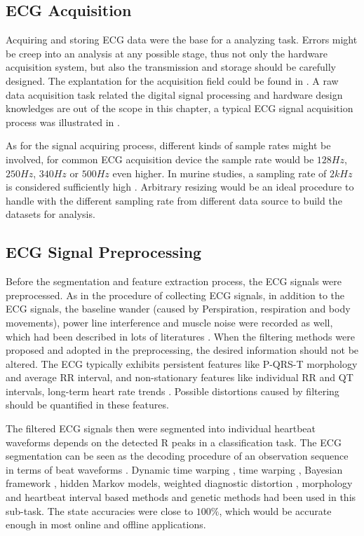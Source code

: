 \documentclass[graybox]{svmult}
\begin{document}
\subsection{ECG Acquisition}
Acquiring and storing ECG data were the base for a analyzing task. Errors might be creep into an analysis at any possible stage, thus not only the hardware acquisition system, but also the transmission and storage should be carefully designed. The explantation for the acquisition field could be found in \citep{clifford2006web}. A raw data acquisition task related the digital signal processing and hardware design knowledges are out of the scope in this chapter, a typical ECG signal acquisition process was illustrated in \citep{silva2011dsp}. 

As for the signal acquiring process, different kinds of sample rates might be involved, for common ECG acquisition device the sample rate would be $128Hz$, $250Hz$, $340Hz$ or $500Hz$ even higher. In murine studies, a sampling rate of $2kHz$ is considered sufficiently high \citep{ai1996studies}. Arbitrary resizing would be an ideal procedure to handle with the different sampling rate from different data source to build the datasets for analysis.

\subsection{ECG Signal Preprocessing}
Before the segmentation and feature extraction process, the ECG signals were preprocessed. As in the procedure of collecting ECG signals,  in addition to the ECG signals, the baseline wander (caused by Perspiration, respiration and body movements), power line interference and muscle noise were recorded as well, which had been described in lots of literatures \citep{blanco2008ecg}.
When the filtering methods were proposed and adopted in the preprocessing, the desired information should not be altered. The ECG typically exhibits persistent features like P-QRS-T morphology and average RR interval,  and non-stationary features like individual RR and QT intervals, long-term heart rate trends \citep{clifford2006advanced}. Possible distortions caused by filtering should be quantified in these features.

The filtered ECG signals then were segmented into individual heartbeat waveforms depends on the detected R peaks in a classification task.  The ECG segmentation can be seen as the decoding procedure of an observation sequence in terms of beat waveforms \citep{andreao2006ecg}. Dynamic time warping \citep{vullings1998automated}, time warping \citep{vullings1997ecg}, Bayesian framework \citep{sayadi2009model}, hidden Markov models\citep{andreao2006ecg}, weighted diagnostic distortion \citep{zigel2000weighted}, morphology and heartbeat interval based methods \citep{de2004automatic} and genetic methods \citep{gacek2003genetic} had been used in this sub-task. The state accuracies were close to $100\%$, which would be accurate enough in most online and offline applications. 
\end{document}
